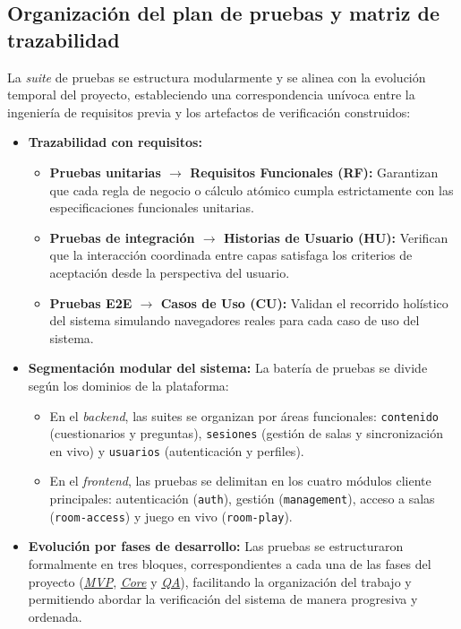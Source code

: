 \subsection{Organización del plan de pruebas y matriz de trazabilidad}\label{subsec:organizacion_trazabilidad}

La \textit{suite} de pruebas se estructura modularmente y se alinea con la evolución temporal del proyecto, estableciendo una correspondencia unívoca entre la ingeniería de requisitos previa y los artefactos de verificación construidos:

\begin{itemize}
    \item \textbf{Trazabilidad con requisitos:}
    \begin{itemize}
        \item \textbf{Pruebas unitarias $\rightarrow$ Requisitos Funcionales (RF):} Garantizan que cada regla de negocio o cálculo atómico cumpla estrictamente con las especificaciones funcionales unitarias.
        \item \textbf{Pruebas de integración $\rightarrow$ Historias de Usuario (HU):} Verifican que la interacción coordinada entre capas satisfaga los criterios de aceptación desde la perspectiva del usuario.
        \item \textbf{Pruebas E2E $\rightarrow$ Casos de Uso (CU):} Validan el recorrido holístico del sistema simulando navegadores reales para cada caso de uso del sistema.
    \end{itemize}
    \item \textbf{Segmentación modular del sistema:} La batería de pruebas se divide según los dominios de la plataforma:
    \begin{itemize}
        \item En el \textit{backend}, las suites se organizan por áreas funcionales: \texttt{contenido} (cuestionarios y preguntas), \texttt{sesiones} (gestión de salas y sincronización en vivo) y \texttt{usuarios} (autenticación y perfiles).
        \item En el \textit{frontend}, las pruebas se delimitan en los cuatro módulos cliente principales: autenticación (\texttt{auth}), gestión (\texttt{management}), acceso a salas (\texttt{room-access}) y juego en vivo (\texttt{room-play}).
    \end{itemize}
    \item \textbf{Evolución por fases de desarrollo:} Las pruebas se estructuraron formalmente en tres bloques, correspondientes a cada una de las fases del proyecto (\hyperref[fase:mvp]{\textit{MVP}}, \hyperref[fase:core]{\textit{Core}} y \hyperref[fase:qa]{\textit{QA}}), facilitando la organización del trabajo y permitiendo abordar la verificación del sistema de manera progresiva y ordenada.
\end{itemize}

